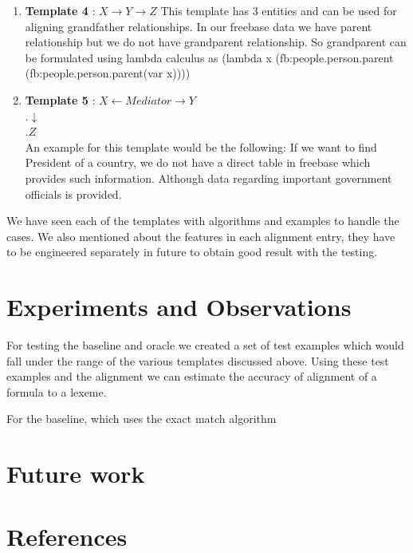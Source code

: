 \documentclass[12pt, a4paper]{article}
\begin{document}
\begin{enumerate}
{\bf formula} = \\"(lambda x (fb:people.person.spouse \\(fb:people.person.gender.female(var x))))"\\
{\bf lexeme} = "wife of"\\
{\bf source} = "ALIGNMENT"\\
{\bf features} = \{FB\_typed\_size :aaa, Intersection\_size\_typed:bbb, "NL-size":ccc\}

The algorithm used to align the formula is still similar to the ones discussed above but we now use a unique lambda function which would represent the formula. This is yet to be implemented and tested.

A few more templates which would be our targets for the end project are discussed with an example.

\item {\bf Template 4} : $X \rightarrow Y \rightarrow Z$
This template has 3 entities and can be used for aligning grandfather relationships. In our freebase data we have parent relationship but we do not have grandparent relationship. So grandparent can be formulated using lambda calculus as (lambda x (fb:people.person.parent (fb:people.person.parent(var x))))

\item {\bf Template 5} : $X\leftarrow Mediator \rightarrow Y$\\
.\qquad\qquad$\downarrow$\\
.\qquad\qquad$Z$\\
An example for this template would be the following: If we want to find President of a country, we do not have a direct table in freebase which provides such information. Although data regarding important government officials is provided.
	
\end{enumerate}

We have seen each of the templates with algorithms and examples to handle the cases. We also mentioned about the features in each alignment entry, they have to be engineered separately in future to obtain good result with the testing. 

\section{Experiments and Observations}
For testing the baseline and oracle we created a set of test examples which would fall under the range of the various templates discussed above. Using these test examples and the alignment we can estimate the accuracy of alignment of a formula to a lexeme.

For the baseline, which uses the exact match algorithm




\section{Future work}

\section{References}
\end{document}
